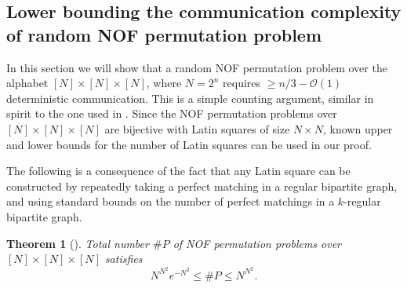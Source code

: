 \documentclass[10pt,a4paper]{article}
\newtheorem{theorem}{Theorem}
\newcommand{\Oh}{\mathcal{O}}
\newcommand{\jnote}[1]{\todo[inline, color=blue!30!white]{#1 \\ -\textsc{Jarek}}}
\newcommand{\joshnote}[1]{\todo[inline, color=red!30!white]{#1 \\ -\textsc{Josh}}}
\begin{document}
\subsection{Lower bounding the communication complexity of random NOF permutation problem}

In this section we will show that a random NOF permutation problem over the alphabet $[N] \times [N] \times [N]$, where $N = 2^n$ requires $\geq n/3 - \Oh(1)$ deterministic communication. This is a simple counting argument, similar in spirit to the one used in \cite{DP08}. Since the NOF permutation problems over $[N] \times [N] \times [N]$ are bijective with Latin squares of size $N \times N$, known upper and lower bounds for the number of Latin squares can be used in our proof.

The following is a consequence of the fact that any Latin square can be constructed by repeatedly taking a perfect matching in a regular bipartite graph, and using standard bounds on the number of perfect matchings in a $k$-regular bipartite graph. 
\begin{theorem}[\cite{VW01}]
\label{thm:nof-number}
Total number $\#P$ of NOF permutation problems over $[N] \times [N] \times [N]$ satisfies
\begin{equation*}
    N^{N^2} e^{-N^2} \leq \#P \leq N^{N^2}.
\end{equation*}
\end{theorem}
\end{document}
